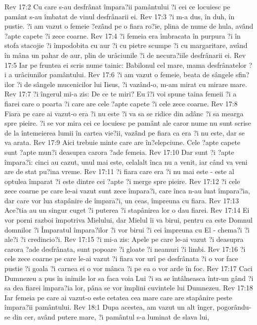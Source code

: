 Rev 17:2  Cu care s-au desfrânat împara?ii pamântului ?i cei ce locuiesc pe pamânt s-au îmbatat de vinul desfrânarii ei.
Rev 17:3  ?i m-a dus, în duh, în pustie. ?i am vazut o femeie ?ezând pe o fiara ro?ie, plina de nume de hula, având ?apte capete ?i zece coarne.
Rev 17:4  ?i femeia era îmbracata în purpura ?i în stofa stacojie ?i împodobita cu aur ?i cu pietre scumpe ?i cu margaritare, având în mâna un pahar de aur, plin de urâciunile ?i de necura?iile desfrânarii ei.
Rev 17:5  Iar pe fruntea ei scris nume tainic: Babilonul cel mare, mama desfrânatelor ?i a urâciunilor pamântului.
Rev 17:6  ?i am vazut o femeie, beata de sângele sfin?ilor ?i de sângele mucenicilor lui Iisus, ?i vazând-o, m-am mirat cu mirare mare.
Rev 17:7  ?i îngerul mi-a zis: De ce te miri? Eu î?i voi spune taina femeii ?i a fiarei care o poarta ?i care are cele ?apte capete ?i cele zece coarne.
Rev 17:8  Fiara pe care ai vazut-o era ?i nu este ?i va sa se ridice din adânc ?i sa mearga spre pieire. ?i se vor mira cei ce locuiesc pe pamânt ale caror nume nu sunt scrise de la întemeierea lumii în cartea vie?ii, vazând pe fiara ca era ?i nu este, dar se va arata.
Rev 17:9  Aici trebuie minte care are în?elepciune. Cele ?apte capete sunt ?apte mun?i deasupra carora ?ade femeia.
Rev 17:10  Dar sunt ?i ?apte împara?i: cinci au cazut, unul mai este, celalalt înca nu a venit, iar când va veni are de stat pu?ina vreme.
Rev 17:11  ?i fiara care era ?i nu mai este - este al optulea împarat ?i este dintre cei ?apte ?i merge spre pieire.
Rev 17:12  ?i cele zece coarne pe care le-ai vazut sunt zece împara?i, care înca n-au luat împara?ia, dar care vor lua stapânire de împara?i, un ceas, împreuna cu fiara.
Rev 17:13  Ace?tia au un singur cuget ?i puterea ?i stapânirea lor o dau fiarei.
Rev 17:14  Ei vor porni razboi împotriva Mielului, dar Mielul îi va birui, pentru ca este Domnul domnilor ?i Împaratul împara?ilor ?i vor birui ?i cei împreuna cu El - chema?i ?i ale?i ?i credincio?i.
Rev 17:15  ?i mi-a zis: Apele pe care le-ai vazut ?i deasupra carora ?ade desfrânata, sunt popoare ?i gloate ?i neamuri ?i limbi.
Rev 17:16  ?i cele zece coarne pe care le-ai vazut ?i fiara vor urî pe desfrânata ?i o vor face pustie ?i goala ?i carnea ei o vor mânca ?i pe ea o vor arde în foc.
Rev 17:17  Caci Dumnezeu a pus în inimile lor sa faca voia Lui ?i sa se întâlneasca într-un gând ?i sa dea fiarei împara?ia lor, pâna se vor împlini cuvintele lui Dumnezeu.
Rev 17:18  Iar femeia pe care ai vazut-o este cetatea cea mare care are stapânire peste împara?ii pamântului.
Rev 18:1  Dupa acestea, am vazut un alt înger, pogorându-se din cer, având putere mare, ?i pamântul s-a luminat de slava lui,
